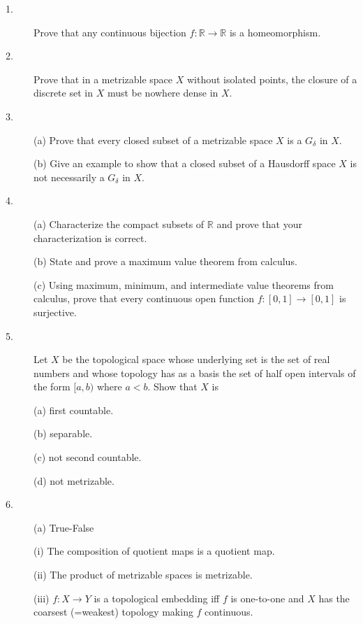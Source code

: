 \documentclass{article}
\def\R{\mathbb R}
\begin{document}
\begin{description}
\item[1.]
Prove that any continuous bijection $f : \R \to \R$ is a homeomorphism.

\item[2.]
Prove that in a metrizable space $X$ without isolated points, the closure of
a discrete set in $X$ must be nowhere dense in $X$.

\item[3.] (a)
Prove that every closed subset of a metrizable space $X$ is a $G_\delta$ in
$X$.

\item[\quad] (b)
Give an example to show that a closed subset of a Hausdorff space $X$ is not
necessarily a $G_\delta$ in $X$.

\item[4.] (a)
Characterize the compact subsets of $\R$ and prove that your characterization
is correct.

\item[\quad] (b)
State and prove a maximum value theorem from calculus.

\item[\quad] (c)
Using maximum, minimum, and intermediate value theorems from calculus, prove
that every continuous open function $f : [0,1] \to [0,1]$ is surjective.

\item[5.]
Let $X$ be the topological space whose underlying set is the set of real
numbers and whose topology has as a basis the set of half open intervals
of the form $[a,b)$ where $a < b$. Show that $X$ is

\item[\quad] (a)
first countable.

\item[\quad] (b)
separable.

\item[\quad] (c)
not second countable.

\item[\quad] (d)
not metrizable.

\item[6.] (a)
True-False

\item[\qquad] (i)
The composition of quotient maps is a quotient map.

\item[\qquad] (ii)
The product of metrizable spaces is metrizable.

\item[\qquad] (iii)
$f: X \to Y$ is a topological embedding iff $f$ is one-to-one and $X$ has
the coarsest (=weakest) topology making $f$ continuous.


\end{description}
\end{document}

